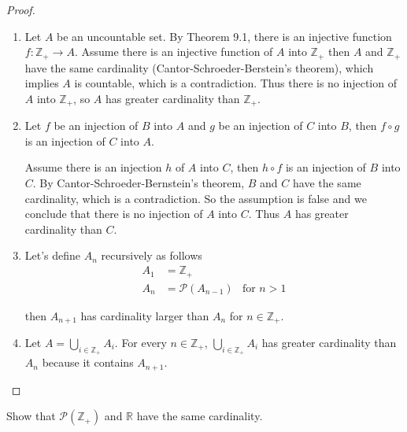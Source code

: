 \begin{proof}
    \begin{enumerate}[label={(\alph*)}]
        \item Let $A$ be an uncountable set. By Theorem 9.1, there is an injective function $f: \mathbb{Z}_{+}\to A$. Assume there is an injective function of $A$ into $\mathbb{Z}_{+}$ then $A$ and $\mathbb{Z}_{+}$ have the same cardinality (Cantor-Schroeder-Berstein's theorem), which implies $A$ is countable, which is a contradiction. Thus there is no injection of $A$ into $\mathbb{Z}_{+}$, so $A$ has greater cardinality than $\mathbb{Z}_{+}$.
        \item Let $f$ be an injection of $B$ into $A$ and $g$ be an injection of $C$ into $B$, then $f\circ g$ is an injection of $C$ into $A$.

              Assume there is an injection $h$ of $A$ into $C$, then $h\circ f$ is an injection of $B$ into $C$. By Cantor-Schroeder-Bernstein's theorem, $B$ and $C$ have the same cardinality, which is a contradiction. So the assumption is false and we conclude that there is no injection of $A$ into $C$. Thus $A$ has greater cardinality than $C$.
        \item Let's define $A_{n}$ recursively as follows
              \begin{align*}
                  A_{1} & = \mathbb{Z}_{+}                            \\
                  A_{n} & = \mathscr{P}(A_{n-1}) & \text{for $n > 1$}
              \end{align*}

              then $A_{n+1}$ has cardinality larger than $A_{n}$ for $n\in\mathbb{Z}_{+}$.
        \item Let $A = \bigcup_{i\in\mathbb{Z}_{+}}A_{i}$. For every $n\in\mathbb{Z}_{+}$, $\bigcup_{i\in\mathbb{Z}_{+}}A_{i}$ has greater cardinality than $A_{n}$ because it contains $A_{n+1}$.
    \end{enumerate}
\end{proof}

\begin{exercise}\label{chapter1:section9:exercise8}
    Show that $\mathscr{P}(\mathbb{Z}_{+})$ and $\mathbb{R}$ have the same cardinality.
\end{exercise}

